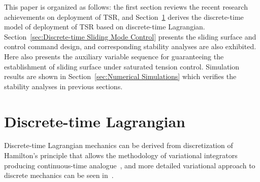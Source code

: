 \documentclass[10pt,onecolumn,draftcls]{IEEEtran}
\begin{document}
This paper is organized as follows: the first section reviews the recent research achievements on deployment of TSR, and Section~\ref{sec:Discrete-time Lagrangian} derives the discrete-time model of deployment of TSR based on discrete-time Lagrangian. Section~\ref{sec:Discrete-time Sliding Mode Control} presents the sliding surface and control command design, and corresponding stability analyses are also exhibited. Here also presents the auxiliary variable sequence for guaranteeing the establishment of sliding surface under saturated tension control. Simulation results are shown in Section~\ref{sec:Numerical Simulations} which verifies the stability analyses in previous sections.

\section{Discrete-time Lagrangian}\label{sec:Discrete-time Lagrangian} 
Discrete-time Lagrangian mechanics can be derived from discretization of Hamilton's principle that allows the methodology of variational integrators producing continuous-time analogue~\cite{Bloch2005Controlled}, 
and more detailed  variational approach to discrete mechanics can be seen in~\cite{Marsden2001Discrete}. 
\end{document}
